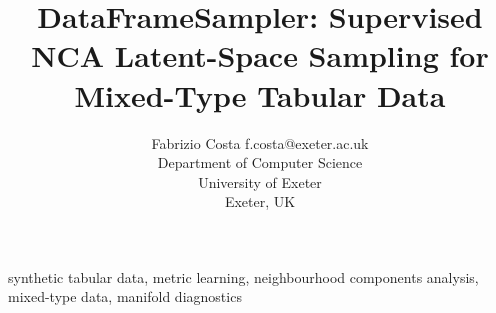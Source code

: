 \documentclass[twoside,11pt]{article}
\begin{document}
\title{DataFrameSampler: Supervised NCA Latent-Space Sampling for Mixed-Type Tabular Data}

\author{\name Fabrizio Costa \email f.costa@exeter.ac.uk\\
\addr Department of Computer Science\\
University of Exeter\\
Exeter, UK}


\maketitle

\begin{abstract}

\end{abstract}

\begin{keywords}
synthetic tabular data, metric learning, neighbourhood components analysis, mixed-type data, manifold diagnostics
\end{keywords}













\clearpage
\appendix



\end{document}
